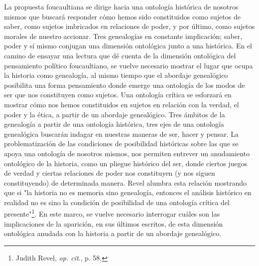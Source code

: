 La propuesta foucaultiana se dirige hacia una ontología histórica de
nosotros mismos que buscará responder cómo hemos sido constituidos como
sujetos de saber, como sujetos imbricados en relaciones de poder, y por
último, como sujetos morales de nuestro accionar. Tres genealogías en
constante implicación; saber, poder y sí mismo conjugan una dimensión
ontológica junto a una histórica. En el camino de ensayar una lectura
que dé cuenta de la dimensión ontológica del pensamiento político
foucaultiano, se vuelve necesario mostrar el lugar que ocupa la historia
como genealogía, al mismo tiempo que el abordaje genealógico posibilita
una forma pensamiento donde emerge una ontología de los modos de ser que
nos constituyen como sujetos. Una ontología crítica se esforzará en
mostrar cómo nos hemos constituidos en sujetos en relación con la
verdad, el poder y la ética, a partir de un abordaje genealógico. Tres
ámbitos de la genealogía a partir de una ontología histórica, tres ejes
de una ontología genealógica buscarán indagar en nuestras maneras de
ser, hacer y pensar. La problematización de las condiciones de
posibilidad históricas sobre las que se apoya una ontología de nosotros
mismos, nos permiten entrever un anudamiento ontológico de la historia,
como un pliegue histórico del ser, donde ciertos juegos de verdad y
ciertas relaciones de poder nos constituyen (y nos siguen constituyendo)
de determinada manera. Revel alumbra esta relación mostrando que si "la
historia no es memoria sino genealogía, entonces el análisis histórico
en realidad no es sino la condición de posibilidad de una ontología
crítica del presente"\footnote{Judith Revel, \emph{op. cit}., p. 58.}.
En este marco, se vuelve necesario interrogar cuáles son las
implicaciones de la aparición, en sus últimos escritos, de esta
dimensión ontológica anudada con la historia a partir de un abordaje
genealógico.

